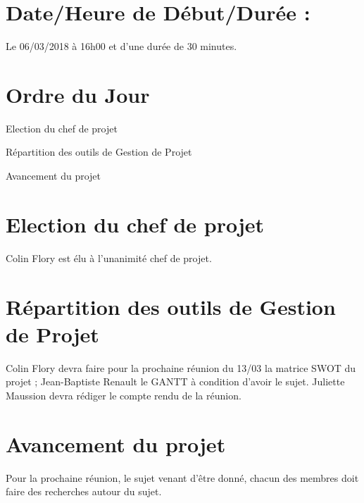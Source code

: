 \documentclass{meetingmins}
\begin{document}
\maketitle

\section{Date/Heure de Début/Durée :}
Le 06/03/2018 à 16h00 et d'une durée de 30 minutes.

\section{Ordre du Jour}
\begin{items}
\item
Election du chef de projet
\item
Répartition des outils de Gestion de Projet
\item
Avancement du projet
\end{items}

\section{Election du chef de projet}

Colin Flory est élu à l’unanimité chef de projet.
\section{Répartition des outils de Gestion de Projet}
Colin Flory devra faire pour la prochaine réunion du 13/03 la matrice SWOT du projet ; Jean-Baptiste Renault le GANTT à condition d’avoir le sujet. Juliette Maussion devra rédiger le compte rendu de la réunion.

\section{Avancement du projet}
Pour la prochaine réunion, le sujet venant d’être donné, chacun des membres doit faire des recherches autour du sujet.
\end{document}
